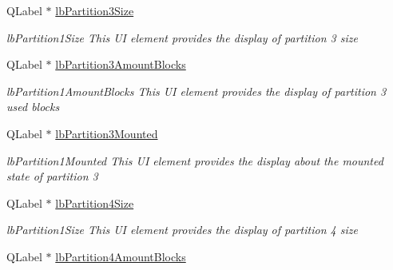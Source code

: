 \begin{DoxyCompactItemize}
\mbox{\label{classui_1_1window_1_1_disk_info_a97603510a38aaf5d13c550aa606f4c99}} 
Q\+Label $\ast$ \mbox{\hyperlink{classui_1_1window_1_1_disk_info_a97603510a38aaf5d13c550aa606f4c99}{lb\+Partition3\+Size}}
\begin{DoxyCompactList}\small\item\em lb\+Partition1\+Size This UI element provides the display of partition 3 size \end{DoxyCompactList}\item 
\mbox{\label{classui_1_1window_1_1_disk_info_a05b4a04aee897e5a589b892d5462e756}} 
Q\+Label $\ast$ \mbox{\hyperlink{classui_1_1window_1_1_disk_info_a05b4a04aee897e5a589b892d5462e756}{lb\+Partition3\+Amount\+Blocks}}
\begin{DoxyCompactList}\small\item\em lb\+Partition1\+Amount\+Blocks This UI element provides the display of partition 3 used blocks \end{DoxyCompactList}\item 
\mbox{\label{classui_1_1window_1_1_disk_info_ae03aff76e9ca7625a5b6dd96f6d3f478}} 
Q\+Label $\ast$ \mbox{\hyperlink{classui_1_1window_1_1_disk_info_ae03aff76e9ca7625a5b6dd96f6d3f478}{lb\+Partition3\+Mounted}}
\begin{DoxyCompactList}\small\item\em lb\+Partition1\+Mounted This UI element provides the display about the mounted state of partition 3 \end{DoxyCompactList}\item 
\mbox{\label{classui_1_1window_1_1_disk_info_afd7d0629887029eb93a2842192eaff35}} 
Q\+Label $\ast$ \mbox{\hyperlink{classui_1_1window_1_1_disk_info_afd7d0629887029eb93a2842192eaff35}{lb\+Partition4\+Size}}
\begin{DoxyCompactList}\small\item\em lb\+Partition1\+Size This UI element provides the display of partition 4 size \end{DoxyCompactList}\item 
\mbox{\label{classui_1_1window_1_1_disk_info_a5cc2f462a187529316a3203eebd3492a}} 
Q\+Label $\ast$ \mbox{\hyperlink{classui_1_1window_1_1_disk_info_a5cc2f462a187529316a3203eebd3492a}{lb\+Partition4\+Amount\+Blocks}}

\end{DoxyCompactItemize}
